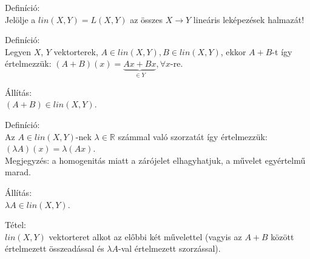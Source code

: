 \documentclass[12pt,a4paper]{scrartcl}
\newenvironment{definicio}{}{}
\newenvironment{tetel}{}{}
\newenvironment{allitas}{}{}
\begin{document}
\begin{definicio}

Definíció:\\
Jelölje a \({lin}\left( {X,Y} \right) = L\left( {X,Y} \right)\) az
összes \(\left. X\rightarrow Y \right.\) lineáris leképezések halmazát!

\end{definicio}

\begin{definicio}

Definíció:\\
Legyen \(X\), \(Y\) vektorterek,
\(A \in {lin}\left( {X,Y} \right),B \in {lin}\left( {X,Y} \right)\),
ekkor \(A + B\)-t így értelmezzük:
\(\left( {A + B} \right)\left( x \right) = \underbrace {Ax + Bx}_{ \in Y},\forall x\)-re.

\end{definicio}

\begin{allitas}

Állítás:\\
\(\left( {A + B} \right) \in {lin}\left( {X,Y} \right)\).

\end{allitas}

\begin{definicio}

Definíció:\\
Az \(A \in {lin}\left( {X,Y} \right)\)-nek \(\lambda \in {\mathbb{R}}\)
számmal való szorzatát így értelmezzük:
\(\left( {\lambda A} \right)\left( x \right) = \lambda\left( {Ax} \right)\).\\
Megjegyzés: a homogenitás miatt a zárójelet elhagyhatjuk, a művelet
egyértelmű marad.

\end{definicio}

\begin{allitas}

Állítás:\\
\(\lambda A \in {lin}\left( {X,Y} \right)\).

\end{allitas}

\begin{tetel}

Tétel:\\
\({lin}\left( {X,Y} \right)\) vektorteret alkot az előbbi két művelettel
(vagyis az \(A + B\) között értelmezett összeadással és
\(\lambda A\)-val értelmezett szorzással).

\end{tetel}
\end{document}
